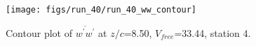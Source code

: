 \begin{figure}[H]
\centering
\texttt{[image: figs/run\_40/run\_40\_ww\_contour]}
\caption{Contour plot of $\overline{w^\prime w^\prime}$ at $z/c$=8.50, $V_{free}$=33.44, station 4.}
\label{fig:run_40_ww_contour}
\end{figure}


